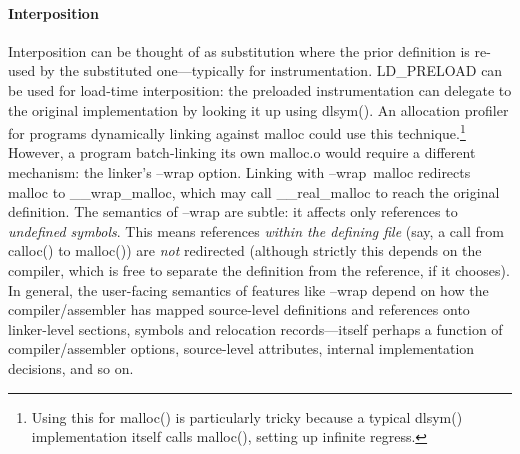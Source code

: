 \paragraph{Interposition}
Interposition can be thought of as substitution where the prior definition
is re-used by the substituted one---typically for instrumentation.
\textsf{LD\_PRELOAD} can be used for load-time interposition: the preloaded instrumentation can delegate to the original implementation by looking it up using \textsf{dlsym()}. 
An allocation profiler for programs dynamically linking against \textsf{malloc} could use this technique.\footnote{Using this for \textsf{malloc()} is particularly tricky because a typical \textsf{dlsym()} implementation itself calls \textsf{malloc()}, setting up infinite regress.}
However, a program batch-linking its own \textsf{malloc.o} would require a different mechanism: the linker's \textsf{--wrap} option. 
Linking with \textsf{--wrap~malloc} redirects \textsf{malloc} to \textsf{\_\_wrap\_malloc}, which may call \textsf{\_\_real\_malloc} to reach the original definition.
The semantics of \textsf{--wrap} are subtle: it affects only references to \emph{undefined symbols}.
This means references \emph{within the defining file} (say, a call from \textsf{calloc()} to \textsf{malloc()}) are \emph{not} redirected
(although strictly this depends on the compiler, which is free to separate the definition
from the reference, if it chooses).
In general, the user-facing semantics of features like \textsf{--wrap} depend on how the compiler/assembler has mapped source-level definitions and references onto linker-level sections, symbols and relocation records---itself perhaps a function of compiler/assembler options, source-level attributes, internal implementation decisions, and so on.



